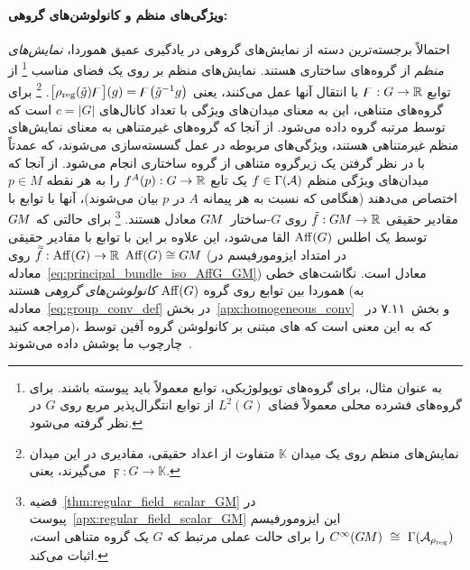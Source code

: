 \paragraph{ویژگی‌های منظم و کانولوشن‌های گروهی:}
احتمالاً برجسته‌ترین دسته از نمایش‌های گروهی در یادگیری عمیق هموردا، \emph{نمایش‌های منظم} از گروه‌های ساختاری هستند.
نمایش‌های منظم بر روی یک فضای مناسب%
\footnote{
	به عنوان مثال، برای گروه‌های توپولوژیکی، توابع معمولاً باید پیوسته باشند.
	برای گروه‌های فشرده محلی معمولاً فضای $L^2(G)$ از توابع انتگرال‌پذیر مربع روی $G$ در نظر گرفته می‌شود.
}
از توابع $\digamma: G \to \mathbb{R}$ با انتقال آنها عمل می‌کنند، یعنی
$\big[ \rho_\textup{reg} (\tilde{g}) \digamma \big](g) = \digamma\big( \tilde{g}^{-1}g \big)$.%
\footnote{
	نمایش‌های منظم روی یک میدان $\mathbb{K}$ متفاوت از اعداد حقیقی، مقادیری در این میدان می‌گیرند، یعنی $\digamma: G \to \mathbb{K}$.
}
برای گروه‌های متناهی، این به معنای میدان‌های ویژگی با تعداد کانال‌های $c = |G|$ است که توسط مرتبه گروه داده می‌شود.
از آنجا که گروه‌های غیرمتناهی به معنای نمایش‌های منظم غیرمتناهی هستند، ویژگی‌های مربوطه در عمل گسسته‌سازی می‌شوند، که عمدتاً با در نظر گرفتن یک زیرگروه متناهی از گروه ساختاری انجام می‌شود.
از آنجا که میدان‌های ویژگی منظم $f \in \Gamma(\mathcal{A})$ یک تابع $f^A(p): G \to \mathbb{R}$ را به هر نقطه $p\in M$ اختصاص می‌دهند (هنگامی که نسبت به هر پیمانه $A$ در $p$ بیان می‌شوند)، آنها با توابع با مقادیر حقیقی $\tilde{f}: G\mkern-1.4muM \to \mathbb{R}$ روی $G$-ساختار~$G\mkern-1.4muM$ معادل هستند.%
\footnote{
	قضیه~\ref{thm:regular_field_scalar_GM} در پیوست~\ref{apx:regular_field_scalar_GM} این ایزومورفیسم
	$C^\infty(\GM)\ \cong\ \Gamma(\A_{\rho_\textup{reg}})$
	را برای حالت عملی مرتبط که $G$ یک گروه متناهی است، اثبات می‌کند.
}
برای حالتی که $G\mkern-1.4muM$ توسط یک اطلس $\operatorname{Aff}(G)$ القا می‌شود، این علاوه بر این با توابع با مقادیر حقیقی $\accentset{\approx}{f}: \operatorname{Aff}(G) \to \mathbb{R}$ روی $\operatorname{Aff}(G) \cong G\mkern-1.4muM$ (در امتداد ایزومورفیسم در معادله~\eqref{eq:principal_bundle_iso_AffG_GM}) معادل است.
نگاشت‌های خطی هموردا بین توابع روی گروه $\operatorname{Aff}(G)$ \emph{کانولوشن‌های گروهی} هستند (به معادله~\eqref{eq:group_conv_def} در بخش~\ref{apx:homogeneous_conv} و بخش~۷.۱۱ در~\cite{gallier2019harmonicRepr} مراجعه کنید)، که به این معنی است که های مبتنی بر کانولوشن گروه آفين توسط چارچوب ما پوشش داده می‌شوند~\cite{Cohen2016-GCNN,Kondor2018-GENERAL,bekkers2020bspline}.


